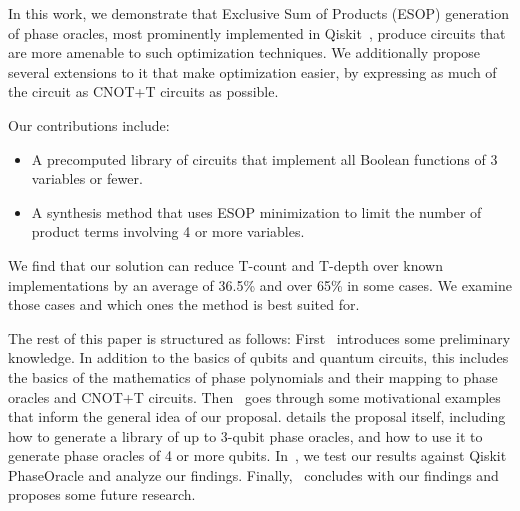 In this work, we demonstrate that Exclusive Sum of Products (ESOP) generation of phase oracles,
most prominently implemented in Qiskit~\cite{bib-phaseoracle}, produce circuits that are more
amenable to such optimization techniques. We additionally propose several extensions to it
that make optimization easier, by expressing as much of the circuit as CNOT+T circuits as
possible.

Our contributions include:

\begin{itemize}
\item A precomputed library of circuits that implement all Boolean functions of
  3 variables or fewer.
\item A synthesis method that uses ESOP minimization to limit the number of
  product terms involving 4 or more variables.
\end{itemize}

We find that our solution can reduce T-count and T-depth over known implementations
by an average of 36.5\% and over 65\% in some cases. We examine those cases and which
ones the method is best suited for.

The rest of this paper is structured as follows: First~
introduces some preliminary knowledge. In addition to the basics of
qubits and quantum circuits, this includes the basics of the
mathematics of phase polynomials and their mapping to phase oracles
and CNOT+T circuits. Then~ goes through some
motivational examples that inform the general idea of our proposal.
 details the proposal itself, including how to
generate a library of up to 3-qubit phase oracles, and how to use
it to generate phase oracles of 4 or more qubits. In~,
we test our results against Qiskit PhaseOracle and analyze our
findings. Finally,~ concludes with our findings and
proposes some future research.

